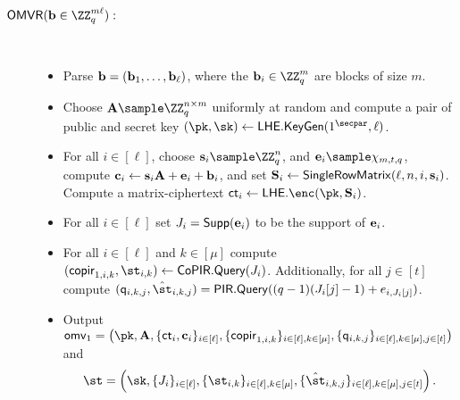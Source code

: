 \begin{description}
\item[$\OMVR(\vc{b} \in \ZZ_q^{m \ell}):$]~
\begin{itemize}
    \item Parse $\mathbf{b} = (\mathbf{b}_1,\dots,\mathbf{b}_\ell)$, where the $\vc{b}_i \in \ZZ_q^m$ are blocks of size $m$.
    \item Choose $\vc{A}\sample \ZZ_q^{n\times m}$ uniformly at random and compute a pair of public and secret key $(\pk,\sk)\gets\LHE.\keygen(1^\secpar,\ell)$.
    \item For all $i\in[\ell]$, choose $\vc{s}_i \sample \ZZ_q^n$, and $\en_i \sample \errordist_{m,t,q}$, compute $\mathbf{c}_i \gets \mathbf{s}_i\mathbf{A}+\mathbf{e}_i+\mathbf{b}_i$, and set $\mathbf{S}_i \gets \mathsf{SingleRowMatrix}(\ell,n,i,\mathbf{s}_i)$. Compute a matrix-ciphertext $\ct_i \gets \LHE.\enc(\pk,\vc{S}_i)$.
    \item For all $i\in[\ell]$ set $J_i = \mathsf{Supp}(\mathbf{e}_i)$ to be the support of $\mathbf{e}_i$.  
    \item For all $i\in[\ell]$ and $k\in[\mu]$ compute $(\copir_{1,i,k},\st_{i,k})\gets \CoPIR.\query(J_i)$. Additionally, for all $j \in [t]$ compute $(\quer_{i,k,j},\hat{\st}_{i,k,j}) = \PIR.\query((q-1)(J_i[j]-1)+e_{i,J_i[j]})$.
     \item Output $\omv_1=\left(\pk,\vc{A},\{\ct_i, \vc{c}_i\}_{i\in [\ell]},\{\copir_{1,i,k}\}_{i\in [\ell],k\in[\mu]},\{\quer_{i,k,j}\}_{i \in [\ell],k\in[\mu], j \in [t]}\right)$ and $$\st = \left(\sk,\{J_i\}_{i \in [\ell]},\{\st_{i,k}\}_{i \in [\ell],k\in[\mu]},\{\hat{\st}_{i,k,j}\}_{i \in [\ell],k\in[\mu], j \in [t]}\right).$$
\end{itemize}


\end{description}
